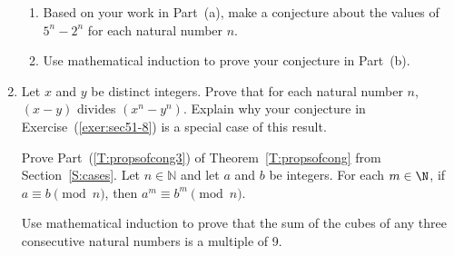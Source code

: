 \begin{enumerate}
\begin{enumerate}
  \item Based on your work in Part~(a), make a conjecture about the values of  $5^n  - 2^n $ for each natural number  $n$.  \label{exer:sec51-8b}
  \item Use mathematical induction to prove your conjecture in Part~(b).
\end{enumerate}

\item Let $x$ and $y$ be distinct integers.  Prove that for each natural number $n$, $\left( x - y \right)$ divides $\left( x^n - y^n \right)$.  Explain why your conjecture in 
Exercise~(\ref{exer:sec51-8}) is a special case of this result.

\xitem Prove Part~(\ref{T:propsofcong3}) of Theorem~\ref{T:propsofcong} from Section~\ref{S:cases}.
Let  $n \in \mathbb{N}$ and let  $a$ and $b$ be integers.  For each $m \in \N$, if  
$a \equiv b \pmod n$, then  $a^m  \equiv b^m \pmod n$. 
\label{exer:sec51-cong}




%
%

%

\xitem Use mathematical induction to prove that the sum of the cubes of any three consecutive natural numbers is a multiple of 9. \label{exer:sec51-13}




\end{enumerate}
